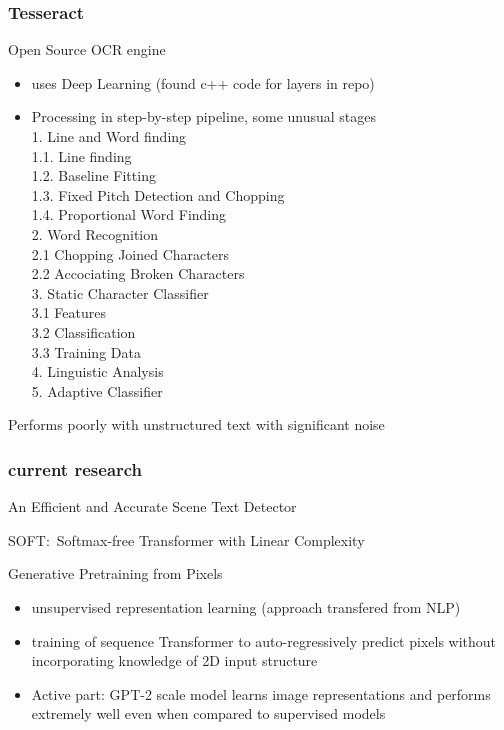 \subsubsection*{Tesseract}
Open Source OCR engine~\cite{smith_overview_2007}
\begin{itemize}
    \item uses Deep Learning (found c++ code for layers in repo)
    \item Processing in step-by-step pipeline, some unusual stages\\
        1. Line and Word finding\\
        1.1. Line finding\\
        1.2. Baseline Fitting\\
        1.3. Fixed Pitch Detection and Chopping\\
        1.4. Proportional Word Finding\\
        2. Word Recognition\\
        2.1 Chopping Joined Characters\\
        2.2 Accociating Broken Characters\\
        3. Static Character Classifier\\
        3.1 Features\\
        3.2 Classification\\
        3.3 Training Data\\
        4. Linguistic Analysis\\
        5. Adaptive Classifier
\end{itemize}
Performs poorly with unstructured text with significant noise


\subsubsection*{current research}
An Efficient and Accurate Scene Text Detector~\cite{zhou_east_2017}

SOFT:\ Softmax-free Transformer with Linear Complexity~\cite{lu_soft_2021}

Generative Pretraining from Pixels~\cite{chen_generative_nodate}
\begin{itemize}
    \item unsupervised representation learning (approach transfered from NLP)
    \item training of sequence Transformer to auto-regressively predict pixels without incorporating
        knowledge of 2D input structure
    \item Active part: GPT-2 scale model learns image representations and performs extremely well even
        when compared to supervised models
\end{itemize}

